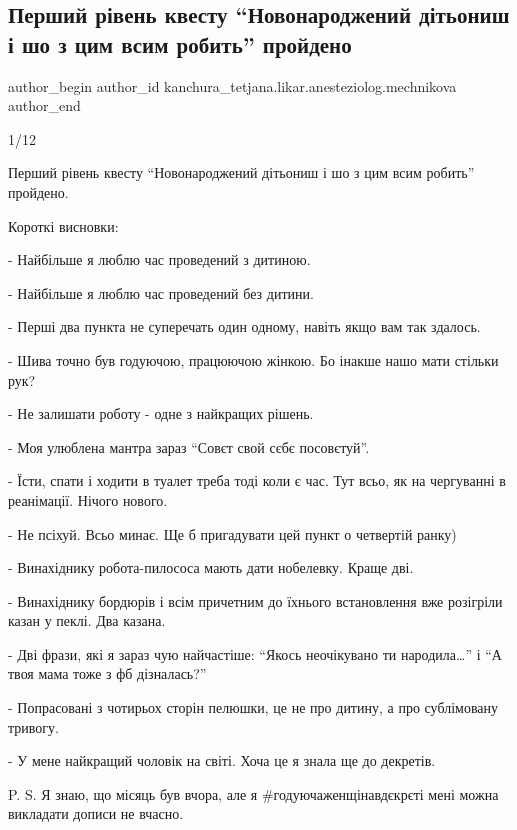  
 
 
 
 

\subsection{Перший рівень квесту \enquote{Новонароджений дітьониш і шо з цим всим робить} пройдено}
\label{sec:04_06_2023.fb.kanchura_tetjana.likar.anesteziolog.mechnikova.1.kvest_novonarodzhenyj_ditjonysh_scho_z_cym_robyty}

\ifcmt
 author_begin
   author_id kanchura_tetjana.likar.anesteziolog.mechnikova
 author_end
\fi

1/12 \par
Перший рівень квесту \enquote{Новонароджений дітьониш і шо з цим всим робить} пройдено.\par
Короткі висновки:\par
- Найбільше я люблю час проведений з дитиною.\par
- Найбільше я люблю час проведений без дитини.\par
- Перші два пункта не суперечать один одному, навіть якщо вам так здалось.\par
- Шива точно був годуючою, працюючою жінкою. Бо інакше нашо мати стільки рук? \par
- Не залишати роботу - одне з найкращих рішень.\par
- Моя улюблена мантра зараз \enquote{Совєт свой сєбє посовєтуй}.\par
- Їсти, спати і ходити в туалет треба тоді коли є час. Тут всьо, як на чергуванні в реанімації. Нічого нового.\par
- Не псіхуй. Всьо минає. Ще б пригадувати цей пункт о четвертій ранку)\par
- Винахіднику робота-пилососа мають дати нобелевку. Краще дві.\par
- Винахіднику бордюрів і всім причетним до їхнього встановлення вже розігріли казан у пеклі. Два казана.\par
- Дві фрази, які я зараз чую найчастіше: \enquote{Якось неочікувано ти народила…} і \enquote{А твоя мама тоже з фб дізналась?}\par
- Попрасовані з чотирьох сторін пелюшки, це не про дитину, а про сублімовану тривогу.\par
- У мене найкращий чоловік на світі. Хоча це я знала ще до декретів.\par
P. S. Я знаю, що місяць був вчора, але я \#годуючаженщінавдєкрєті мені можна викладати дописи не вчасно.\par
